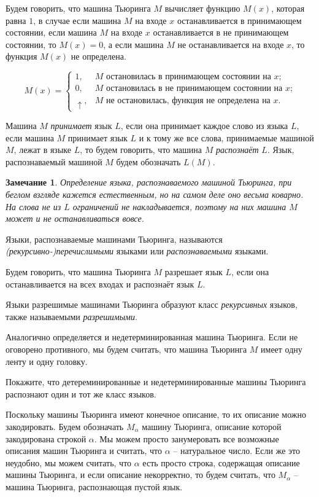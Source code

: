 \documentclass[12pt, leqno]{article}
\theoremstyle{definiton}
\newtheorem{Remark}{Замечание}
\theoremstyle{definition}
\theoremstyle{definition}
\newcounter{problem}
\newcounter{uproblem}
\newcounter{subproblem}
\def\upr{\medskip\noindent\stepcounter{uproblem}{\bf Упражнение \theuproblem .  }\setcounter{subproblem}{0} }
\begin{document}
Будем говорить, что машина Тьюринга $M$ вычисляет функцию $M(x)$, которая равна $1$, в случае если машина $M$ на входе $x$ останавливается в принимающем состоянии, если машина $M$ на входе $x$ останавливается в не принимающем состоянии, то $M(x) = 0$, а если машина $M$ не останавливается на входе $x$, то функция $M(x)$ не определена.

$$
	M(x) = 
	\begin{cases}
		1, & M \text{ остановилась в принимающем состоянии на $x$;} \\
		0, & M \text{ остановилась в не принимающем состоянии на $x$;}\\ 
		\uparrow, & M \text{ не остановилась, функция не определена на $x$.}
	\end{cases}
$$


	 Машина $M$ \emph{принимает} язык $L$, если она принимает каждое слово из языка $L$, если машина $M$ принимает язык $L$ и к тому же все слова, принимаемые машиной $M$, лежат в языке $L$,  то будем говорить, что машина $M$ \emph{распознаёт} $L$. Язык, распознаваемый машиной $M$ будем обозначать $L(M)$.


\begin{Remark}
	Определение языка, распознаваемого машиной Тьюринга, при беглом взгляде кажется естественным, но на самом деле оно весьма коварно. На слова не из $L$ ограничений не накладывается, поэтому на них машина $M$ может и не останавливаться вовсе.
\end{Remark}

Языки, распознаваемые машинами Тьюринга, называются \emph{(рекурсивно-)перечислимыми} языками или \emph{распознаваемыми} языками.

Будем говорить, что машина Тьюринга $M$ разрешает язык $L$, если она останавливается на всех входах и распознаёт язык $L$.

Языки разрешимые машинами Тьюринга образуют класс \emph{рекурсивных} языков, также называемыми \emph{разрешимыми}.
 

Аналогично определяется и недетерминированная машина Тьюринга.
Если не оговорено противного, мы будем считать, что машина Тьюринга $M$ имеет одну ленту и одну головку.

\bigskip

\upr Покажите, что детереминированные и недетерминированные машины Тьюринга распознают один и тот же класс языков. 

\bigskip


Поскольку машины Тьюринга имеют конечное описание, то их описание можно закодировать. Будем обозначать $M_\alpha$ машину Тьюринга, описание которой закодирована строкой $\alpha$. Мы можем просто занумеровать все возможные описания машин Тьюринга и считать, что $\alpha$ -- натуральное число. Если же это неудобно, мы можем считать, что $\alpha$ есть просто строка, содержащая описание машины Тьюринга, и если описание некорректно, то будем считать, что $M_\alpha$ -- машина Тьюринга, распознающая пустой язык.
\end{document}
